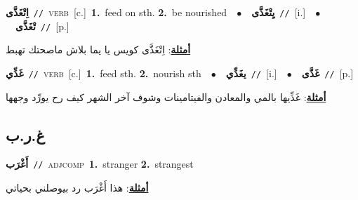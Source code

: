 \documentclass[10pt,a4paper,twoside]{article} %
\begin{document}
\begin{multicols}{2}
{{{{{{{\setlength\topsep{0pt}\textbf{\foreignlanguage{arabic}{اِتْغَذَّى}}\ {\color{gray}\texttt{//}\color{black}}\ \textsc{verb}\ [c.]\ \textbf{1.}~feed on sth.  \textbf{2.}~be nourished\ \ $\bullet$\ \ \setlength\topsep{0pt}\textbf{\foreignlanguage{arabic}{يِتْغَذَّى}}\ {\color{gray}\texttt{//}\color{black}}\ [i.]\ \ $\bullet$\ \ \setlength\topsep{0pt}\textbf{\foreignlanguage{arabic}{تْغَذَّى}}\ {\color{gray}\texttt{//}\color{black}}\ [p.]\  \begin{flushright}\color{gray}\foreignlanguage{arabic}{\textbf{\underline{\foreignlanguage{arabic}{أمثلة}}}: اِتْغَذَّى كويس يا يما بلاش ماصحتك تهبط}\end{flushright}\color{black}} \vspace{2mm}

{\setlength\topsep{0pt}\textbf{\foreignlanguage{arabic}{غَذِّي}}\ {\color{gray}\texttt{//}\color{black}}\ \textsc{verb}\ [c.]\ \textbf{1.}~feed sth.  \textbf{2.}~nourish sth\ \ $\bullet$\ \ \setlength\topsep{0pt}\textbf{\foreignlanguage{arabic}{يغَذِّي}}\ {\color{gray}\texttt{//}\color{black}}\ [i.]\ \ $\bullet$\ \ \setlength\topsep{0pt}\textbf{\foreignlanguage{arabic}{غَذَّى}}\ {\color{gray}\texttt{//}\color{black}}\ [p.]\  \begin{flushright}\color{gray}\foreignlanguage{arabic}{\textbf{\underline{\foreignlanguage{arabic}{أمثلة}}}: غَذِّيها بالمي والمعادن والفيتامينات وشوف آخر الشهر كيف رح يورِّد وجهها}\end{flushright}\color{black}} \vspace{2mm}

\vspace{-3mm}
\subsection*{\color{blue}\foreignlanguage{arabic}{غ.ر.ب}\color{blue}{}} 

{\setlength\topsep{0pt}\textbf{\foreignlanguage{arabic}{أَغْرَب}}\ {\color{gray}\texttt{//}\color{black}}\ \textsc{adj\textunderscore comp}\ \textbf{1.}~stranger  \textbf{2.}~strangest\  \begin{flushright}\color{gray}\foreignlanguage{arabic}{\textbf{\underline{\foreignlanguage{arabic}{أمثلة}}}: هذا أَغْرَب رد بيوصلني بحياتي}\end{flushright}\color{black}} \vspace{2mm}

}}}}}}
\end{multicols}
\end{document}
